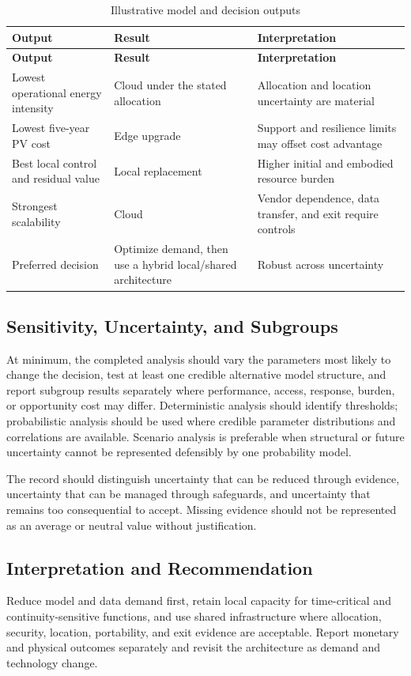 \begin{longtable}{@{}p{}p{}p{}@{}}
\caption{Illustrative model and decision outputs}
\label{tab:comp-ch15-outputs}\\
\toprule
\textbf{Output} & \textbf{Result} & \textbf{Interpretation} \\
\midrule
\endfirsthead
\toprule
\textbf{Output} & \textbf{Result} & \textbf{Interpretation} \\
\midrule
\endhead
\bottomrule
\endlastfoot
Lowest operational energy intensity & Cloud under the stated allocation & Allocation and location uncertainty are material \\
Lowest five-year PV cost & Edge upgrade & Support and resilience limits may offset cost advantage \\
Best local control and residual value & Local replacement & Higher initial and embodied resource burden \\
Strongest scalability & Cloud & Vendor dependence, data transfer, and exit require controls \\
Preferred decision & Optimize demand, then use a hybrid local/shared architecture & Robust across uncertainty \\
\end{longtable}

\subsection{Sensitivity, Uncertainty, and Subgroups}
At minimum, the completed analysis should vary the parameters most likely to
change the decision, test at least one credible alternative model structure, and
report subgroup results separately where performance, access, response, burden,
or opportunity cost may differ. Deterministic analysis should identify thresholds;
probabilistic analysis should be used where credible parameter distributions and
correlations are available. Scenario analysis is preferable when structural or
future uncertainty cannot be represented defensibly by one probability model.

The record should distinguish uncertainty that can be reduced through evidence,
uncertainty that can be managed through safeguards, and uncertainty that remains
too consequential to accept. Missing evidence should not be represented as an
average or neutral value without justification.

\subsection{Interpretation and Recommendation}
Reduce model and data demand first, retain local capacity for time-critical and continuity-sensitive functions, and use shared infrastructure where allocation, security, location, portability, and exit evidence are acceptable. Report monetary and physical outcomes separately and revisit the architecture as demand and technology change.

